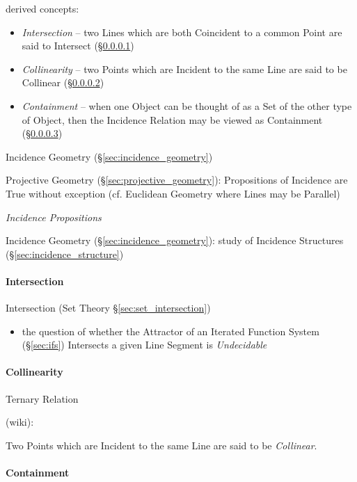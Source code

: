 derived concepts:
\begin{itemize}
  \item \emph{Intersection} -- two Lines which are both Coincident to a common
    Point are said to Intersect (\S\ref{sec:intersection})
  \item \emph{Collinearity} -- two Points which are Incident to the same Line
    are said to be Collinear (\S\ref{sec:collinearity})
  \item \emph{Containment} -- when one Object can be thought of as a Set of the
    other type of Object, then the Incidence Relation may be viewed as
    Containment (\S\ref{sec:containment})
\end{itemize}

Incidence Geometry (\S\ref{sec:incidence_geometry})

Projective Geometry (\S\ref{sec:projective_geometry}): Propositions of Incidence
are True without exception (cf. Euclidean Geometry where Lines may be Parallel)

\emph{Incidence Propositions}

\fist Incidence Geometry (\S\ref{sec:incidence_geometry}): study of Incidence
  Structures (\S\ref{sec:incidence_structure})



\paragraph{Intersection}\label{sec:intersection}\hfill

\fist Intersection (Set Theory \S\ref{sec:set_intersection})

\begin{itemize}
  \item the question of whether the Attractor of an Iterated Function System
    (\S\ref{sec:ifs}) Intersects a given Line Segment is \emph{Undecidable}
\end{itemize}



\paragraph{Collinearity}\label{sec:collinearity}\hfill

Ternary Relation

(wiki):

Two Points which are Incident to the same Line are said to be \emph{Collinear}.



\paragraph{Containment}\label{sec:containment}\hfill

